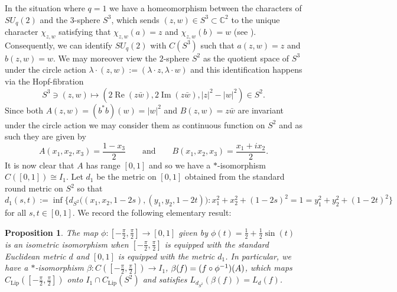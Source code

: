 \documentclass[11pt, reqno, a4paper, final]{amsart}
\theoremstyle{plain}
\newtheorem{proposition}[thm]{Proposition}
\theoremstyle{definition}
\newcommand{\RR}{{\mathbb R}}
\newcommand{\CC}{{\mathbb C}}
\renewcommand{\Im}{{\operatorname{Im}}}
\renewcommand{\Re}{{\operatorname{Re}}}
\newcommand{\Lip}{\operatorname{Lip}}
\newcommand{\black}{\color{black}}
\begin{document}
In the {\black situation where $q = 1$} we have a homeomorphism between the characters of $SU_q(2)$ and the $3$-sphere $S^3$, which sends $(z,w)\in S^3\subset \CC^2$ to the unique character $\chi_{z,w}$ {\black satisfying that} $\chi_{z,w}(a)=z$ and $\chi_{z,w}(b)=w$ (see \cite{Woronowicz-SU2}). Consequently, we can identify $SU_q(2)$ with $C(S^3)$ {\black such that $a(z,w)= z$ and $b(z,w) = w$. We may moreover view the $2$-sphere $S^2$ as the quotient space of $S^3$ under the circle action $\lambda \cdot (z,w) := (\lambda \cdot z,\lambda \cdot w)$ and this identification happens via the Hopf-fibration
\[
S^3 \ni (z,w)\longmapsto \left(2\Re(z\bar{w}),2\Im(z\bar{w}),|z|^2-|w|^2\right)\in S^2.
\]
Since both $A(z,w) = (b^* b)(w) = |w|^2$ and $B(z,w) = z \bar{w}$ are invariant under the circle action we may consider them as continuous function on $S^2$ and as such they are given by
\[
A(x_1,x_2,x_3) = \frac{1 - x_3}{2} \qquad \mbox{and} \qquad B(x_1,x_2,x_3) = \frac{x_1 + i x_2}{2} .
\]}
It is now clear that $A$ has range $[0,1]$ and so we have a $*$-isomorphism $C([0,1])\cong I_1$. {\black Let $d_1$ be the metric on $[0,1]$ obtained from the standard round metric on $S^2$ so that
\[
d_1(s,t) := \inf\big\{ d_{S^2}\big( (x_1,x_2, 1-2s), (y_1,y_2, 1-2t) \big) : x_1^2 + x_2^2 + (1-2s)^2 = 1 = y_1^2 + y_2^2 + (1-2t)^2 \big\}
\]
for all $s,t \in [0,1]$. We record the following elementary result:}  %
\begin{proposition}
 \label{Prop:comm}
The map $\phi\colon [-\tfrac{\pi}{2},\tfrac{\pi}{2}]\to[0,1]$ given by $\phi(t)=\tfrac{1}{2} + \tfrac{1}{2}\sin(t)$ {\black is an isometric isomorphism when $[-\tfrac{\pi}{2},\tfrac{\pi}{2}]$ is equipped with the standard Euclidean metric $d$ and $[0,1]$ is equipped with the metric $d_1$.} In particular, we have a $*$-isomorphism $\beta\colon C([-\tfrac{\pi}{2},\tfrac{\pi}{2}])\to I_1$, $\beta(f) = {\black (f\circ \phi^{-1})(A)}$, which maps $C_{\Lip}([-\tfrac{\pi}{2},\tfrac{\pi}{2}])$ onto $I_1\cap C_{\Lip}(S^2)$ and satisfies $L_{d_{S^2}}(\beta(f))=L_{d}(f)$.
\end{proposition}
\end{document}
